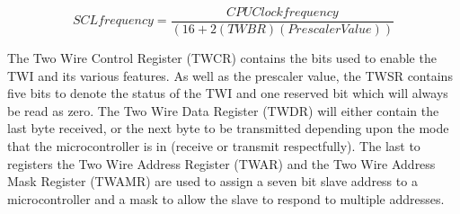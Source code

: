 \begin{equation} 
SCL frequency = \frac{CPU Clock frequency}{(16 + 2(TWBR)(Prescaler Value))}
\label{clkfreq}
\end{equation}

The Two Wire Control Register (TWCR) contains the bits used to enable the TWI and its various features.  As well as the prescaler value, the TWSR contains five bits to denote the status of the TWI and one reserved bit which will always be read as zero.  The Two Wire Data Register (TWDR) will either contain the last byte received, or the next byte to be transmitted depending upon the mode that the microcontroller is in (receive or transmit respectfully).  The last to registers the Two Wire Address Register (TWAR) and the Two Wire Address Mask Register (TWAMR) are used to assign a seven bit slave address to a microcontroller and a mask to allow the slave to respond to multiple addresses.  

